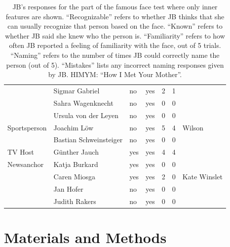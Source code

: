 \documentclass[fleqn,10pt]{SelfArx} %
\begin{document}
\begin{table}[htbp]
\begin{tabular}{lllllll}
		& Sigmar Gabriel               & no      & yes   & 2               & 1            &                  \\
		& Sahra Wagenknecht            & no      & yes   & 0               & 0            &                  \\
		& Ursula von der Leyen         & no      & yes   & 0               & 0            &                  \\
		Sportsperson    & Joachim Löw                 & no      & yes   & 5               & 4            & Wilson           \\
		& Bastian Schweinsteiger       & no      & yes   & 0               & 0            &                  \\
		TV Host         & Günther Jauch               & yes     & yes   & 4               & 4            &                  \\
		Newsanchor      & Katja Burkard                & yes     & yes   & 0               & 0            &                  \\
		& Caren Miosga                 & yes     & yes   & 2               & 0            & Kate Winslet     \\
		& Jan Hofer                    & no      & yes   & 0               & 0            &                  \\
		& Judith Rakers                & no      & yes   & 0               & 0            &  \\        
				\hline       
	\end{tabular}
	
	\parbox{16.5cm}{\caption*{JB's responses for the part of the famous face test where only inner features are shown. “Recognizable” refers to whether JB thinks that she can usually recognize that person based on the face. “Known” refers to whether JB said she knew who the person is. “Familiarity” refers to how often JB reported a feeling of familiarity with the face, out of 5 trials. “Naming” refers to the number of times JB could correctly name the person (out of 5). “Mistakes” lists any incorrect naming responses given by JB. HIMYM: “How I Met Your Mother”.} }
	\label{tab:supp1}
	
\end{table}



\section{Materials and Methods}
\end{document}
